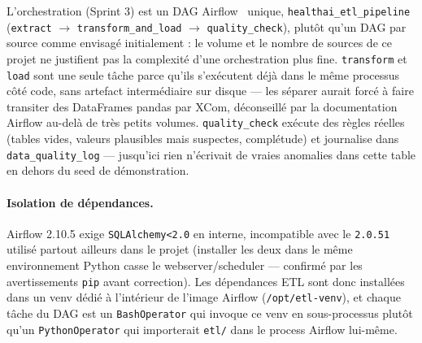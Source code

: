 \documentclass{article}
\begin{document}
L'orchestration (Sprint 3) est un DAG Airflow~\citep{airflow} unique, \texttt{healthai\_etl\_pipeline} (\texttt{extract} $\rightarrow$ \texttt{transform\_and\_load} $\rightarrow$ \texttt{quality\_check}), plutôt qu'un DAG par source comme envisagé initialement : le volume et le nombre de sources de ce projet ne justifient pas la complexité d'une orchestration plus fine. \texttt{transform} et \texttt{load} sont une seule tâche parce qu'ils s'exécutent déjà dans le même processus côté code, sans artefact intermédiaire sur disque — les séparer aurait forcé à faire transiter des DataFrames pandas par XCom, déconseillé par la documentation Airflow au-delà de très petits volumes. \texttt{quality\_check} exécute des règles réelles (tables vides, valeurs plausibles mais suspectes, complétude) et journalise dans \texttt{data\_quality\_log} — jusqu'ici rien n'écrivait de vraies anomalies dans cette table en dehors du seed de démonstration.

\paragraph{Isolation de dépendances.} Airflow 2.10.5 exige \texttt{SQLAlchemy<2.0} en interne, incompatible avec le \texttt{2.0.51} utilisé partout ailleurs dans le projet (installer les deux dans le même environnement Python casse le webserver/scheduler — confirmé par les avertissements \texttt{pip} avant correction). Les dépendances ETL sont donc installées dans un venv dédié à l'intérieur de l'image Airflow (\texttt{/opt/etl-venv}), et chaque tâche du DAG est un \texttt{BashOperator} qui invoque ce venv en sous-processus plutôt qu'un \texttt{PythonOperator} qui importerait \texttt{etl/} dans le process Airflow lui-même.
\end{document}
